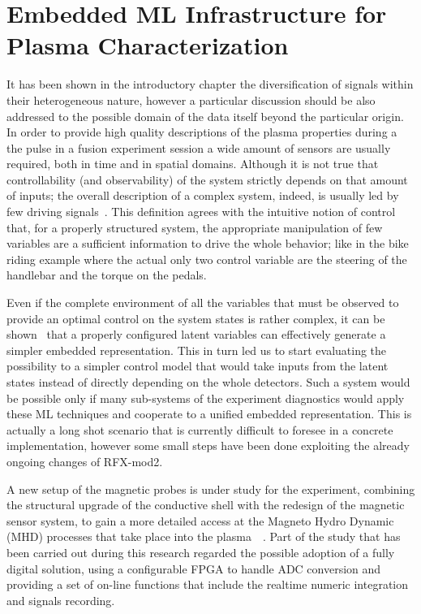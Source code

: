 
\chapter{Embedded ML Infrastructure for Plasma Characterization}
\label{section:4_embedded_ML}

It has been shown in the introductory chapter the diversification of signals within their heterogeneous nature, however a particular discussion should be also addressed to the possible domain of the data itself beyond the particular origin.
In order to provide high quality descriptions of the plasma properties during a the pulse in a fusion experiment session a wide amount of sensors are usually required, both in time and in spatial domains.
Although it is not true that controllability (and observability) of the system strictly depends on that amount of inputs; the overall description of a complex system, indeed, is usually led by few driving signals~\cite{Liu2011}. 
This definition agrees with the intuitive notion of control that, for a properly structured system, the appropriate manipulation of few variables are a sufficient information to drive the whole behavior; like in the bike riding example where the actual only two control variable are the steering of the handlebar and the torque on the pedals. 

Even if the complete environment of all the variables that must be observed to provide an optimal control on the system states is rather complex, it can be shown\cite{Lesort_2018}~\cite{an2019unsupervised} that a properly configured latent variables can effectively generate a simpler embedded representation. This in turn led us to start evaluating the possibility to a simpler control model that would take inputs from the latent states instead of directly depending on the whole detectors.
Such a system would be possible only if many sub-systems of the experiment diagnostics would apply these ML techniques and cooperate to a unified embedded representation. This is actually a long shot scenario that is currently difficult to foresee in a concrete implementation, however some small steps have been done exploiting the already ongoing changes of RFX-mod2.

A new setup of the magnetic probes is under study for the experiment, combining the structural upgrade of the conductive shell with the redesign of the magnetic sensor system, to gain a more detailed access at the Magneto Hydro Dynamic (MHD) processes that take place into the plasma~\cite{zuin2009current}~\cite{innocente2014tearing}.
Part of the study that has been carried out during this research regarded the possible adoption of a fully digital solution, using a configurable FPGA to handle ADC conversion and providing a set of on-line functions that include the realtime numeric integration and signals recording.

